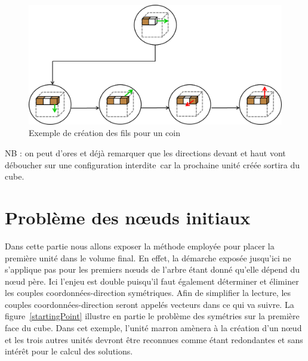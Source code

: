 \begin{figure}[h]
 \centering
 \includegraphics[scale=0.5,keepaspectratio=true]{img/buildCornerChildren.png}
 \caption{Exemple de création des fils pour un coin}
 \label{buildCornerChildren}
\end{figure}

NB : on peut d’ores et déjà remarquer que les directions devant et haut vont déboucher sur une configuration interdite car la prochaine unité créée sortira du cube.

\newpage
\section{Problème des nœuds initiaux}
Dans cette partie nous allons exposer la méthode employée pour 	placer la première unité dans le volume final. En effet, la démarche exposée jusqu’ici ne s’applique pas pour les premiers nœuds de l’arbre étant donné qu’elle dépend du nœud père. Ici l’enjeu est double puisqu’il faut également déterminer et éliminer les couples coordonnées-direction symétriques. Afin de simplifier la lecture, les couples coordonnées-direction seront appelés vecteurs dans ce qui va suivre. La figure~\ref{startingPoint} illustre en partie le problème des symétries sur la première face du cube. Dans cet exemple, l’unité marron amènera à la création d’un nœud et les trois autres unités devront être reconnues comme étant redondantes et sans intérêt pour le calcul des solutions. 

